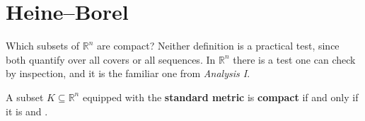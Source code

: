 
\section{Heine--Borel}
\label{sec:heine_borel}

Which subsets of $\mathbb{R}^n$ are compact? Neither definition is a practical test, since both
quantify over all covers or all sequences. In $\mathbb{R}^n$ there is a test one can check by
inspection, and it is the familiar one from \emph{Analysis I}.

\begin{theorem}
\label{thm:heine_borel}
A subset $K \subseteq \mathbb{R}^n$ equipped with the \textbf{standard metric} is
\textbf{compact} if and only if it is  and 
.
\end{theorem}

